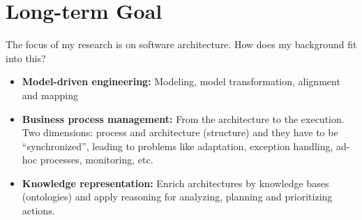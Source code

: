 \documentclass{llncs} %
\begin{document}
\section{Long-term Goal}

The focus of my research is on software architecture.
How does my background fit into this?
\begin{itemize}
	\item \textbf{Model-driven engineering:} Modeling, model transformation, alignment and mapping
	\item \textbf{Business process management:} From the architecture to the execution.
	   Two dimensions: process and architecture (structure) and they have to be ``synchronized'',
		  leading to problems like adaptation, exception handling, ad-hoc processes, monitoring, etc.
	\item \textbf{Knowledge representation:} Enrich architectures by knowledge bases (ontologies)
	  and apply reasoning for analyzing, planning and prioritizing actions.
\end{itemize}






%
\end{document}
